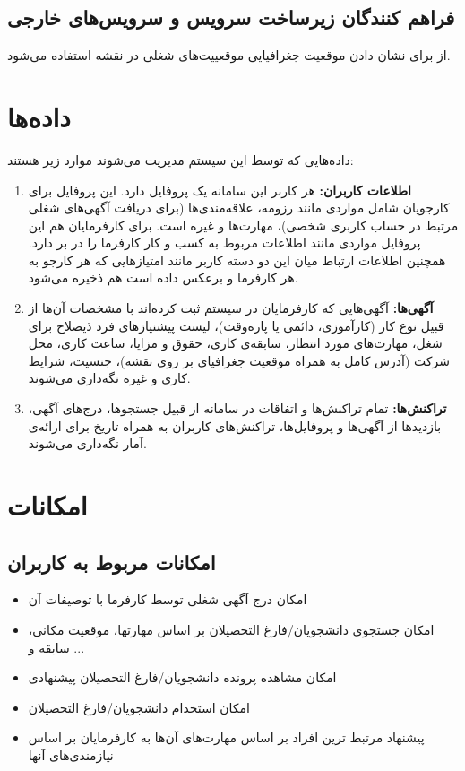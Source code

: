 \subsection{فراهم کنندگان زیرساخت سرویس و سرویس‌های خارجی}
از 
برای نشان دادن موقعیت جغرافیایی موقعییت‌های شغلی در نقشه استفاده می‌شود.

\section{داده‌ها}
داده‌هایی که توسط این سیستم مدیریت می‌شوند موارد زیر هستند:
\begin{enumerate}
\item \textbf{اطلاعات کاربران:}
هر کاربر این سامانه یک پروفایل دارد. این پروفایل برای کارجویان شامل مواردی مانند رزومه، علاقه‌مندی‌ها (برای دریافت آگهی‌های شغلی مرتبط در حساب کاربری شخصی)، مهارت‌ها و غیره است. برای کارفرمایان هم این پروفایل مواردی مانند اطلاعات مربوط به کسب و کار کارفرما را در بر دارد. همچنین اطلاعات ارتباط میان این دو دسته کاربر مانند امتیازهایی که هر کارجو به  هر کارفرما و برعکس داده است هم ذخیره می‌شود.

\item \textbf{آگهی‌ها:}
آگهی‌هایی که کارفرمایان در سیستم ثبت کرده‌اند با مشخصات آن‌ها از قبیل نوع کار (کارآموزی، دائمی یا پاره‌وقت)، لیست پیشنیازهای فرد ذیصلاح برای شغل، مهارت‌های مورد انتظار، سابقه‌ی ‌کاری، حقوق و مزایا، ساعت کاری، محل شرکت (آدرس کامل به همراه موقعیت جغرافیای بر روی نقشه)، جنسیت، شرایط کاری و غیره نگه‌داری می‌شوند.
\item \textbf{تراکنش‌ها:}
تمام تراکنش‌ها و اتفاقات در سامانه از قبیل جستجوها، درج‌های آگهی، بازدید‌ها از آگهی‌ها و پروفایل‌ها، تراکنش‌های کاربران به همراه تاریخ برای ارائه‌ی آمار نگه‌داری می‌شوند.
\end{enumerate}

\section{امکانات}
\subsection{
امکانات مربوط به کاربران}
\begin{itemize}
	\item
	امکان درج آگهی شغلی توسط کارفرما با توصیفات آن
	\item
	امکان جستجوی دانشجویان/فارغ التحصیلان بر اساس مهارتها، موقعیت مکانی، سابقه و ... 
	\item
	امکان مشاهده پرونده دانشجویان/فارغ التحصیلان پیشنهادی
	\item
	امکان استخدام دانشجویان/فارغ التحصیلان
	 \item
	پیشنهاد مرتبط‌‌‌ ‌ترین افراد بر اساس مهارت‌های آن‌ها به کارفرمایان بر اساس نیازمندی‌های آنها
\end{itemize}
